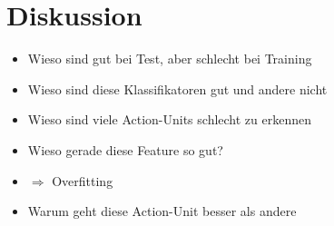 \chapter{Diskussion}
\begin{itemize}
  \item Wieso sind gut bei Test, aber schlecht bei Training 
  \item Wieso sind diese Klassifikatoren gut und andere nicht
   \item Wieso sind viele Action-Units schlecht zu erkennen
   \item Wieso gerade diese Feature so gut?
  \item $\Rightarrow$ Overfitting
  \item Warum geht diese Action-Unit besser als andere
\end{itemize}

